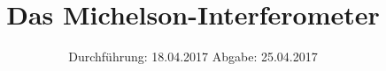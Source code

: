 

\subject{V401}
\title{Das Michelson-Interferometer}
\date{
\centering
  Durchführung: 18.04.2017
  \hspace{3em}
  Abgabe: 25.04.2017
}



\maketitle
\thispagestyle{empty}
\tableofcontents
\newpage



%




\printbibliography


